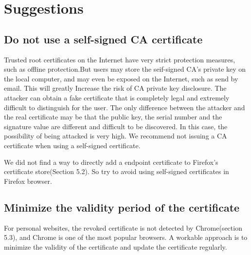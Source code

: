 \section{Suggestions}

\subsection{Do not use a self-signed CA certificate}

Trusted root certificates on the Internet have very strict protection measures, such as offline protection.But users may store the seif-signed CA's private key on the local computer, and may even be exposed on the Internet, such as send by email. This will greatly Increase the risk of CA private key disclosure. The attacker can obtain a fake certificate that is completely legal and extremely difficult to distinguish for the user. The only difference between the attacker and the real certificate may be that the public key, the serial number and the signature value are different and difficult to be discovered. In this case, the possibility of being attacked is very high. We recommend not issuing a CA certificate when using a self-signed certificate.

We did not find a way to directly add a endpoint certificate to Firefox's certificate store(Section 5.2). So try to avoid using self-signed certificates in Firefox browser.

\subsection{Minimize the validity period of the certificate}
For personal websites, the revoked certificate is not detected by Chrome(section 5.3), and Chrome is one of the most popular browsers. A workable approach is to minimize the validity of the certificate and update the certificate regularly. 